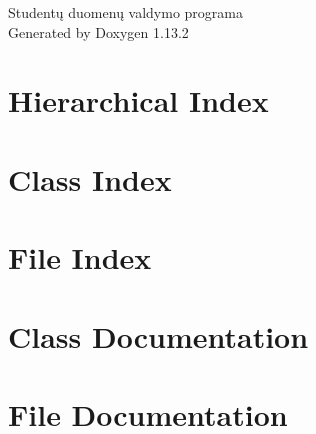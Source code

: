\documentclass[twoside]{book}
\newcommand{\+}{\discretionary{\mbox{\scriptsize$\hookleftarrow$}}{}{}}
\newcommand{\clearemptydoublepage}{%
    \newpage{\pagestyle{empty}\cleardoublepage}%
  }
\begin{document}
  \raggedbottom
    \hypersetup{pageanchor=false,
                bookmarksnumbered=true,
                pdfencoding=unicode
               }
  \begin{titlepage}
  \vspace*{7cm}
  \begin{center}%
  {\Large Studentų duomenų valdymo programa}\\
  \vspace*{1cm}
  {\large Generated by Doxygen 1.13.2}\\
  \end{center}
  \end{titlepage}
  \clearemptydoublepage
  \tableofcontents
  \clearemptydoublepage
  \hypersetup{pageanchor=true}
\chapter{Hierarchical Index}

\chapter{Class Index}

\chapter{File Index}

\chapter{Class Documentation}


\chapter{File Documentation}











  \backmatter
  \newpage
  \clearemptydoublepage
  \printindex
\end{document}
